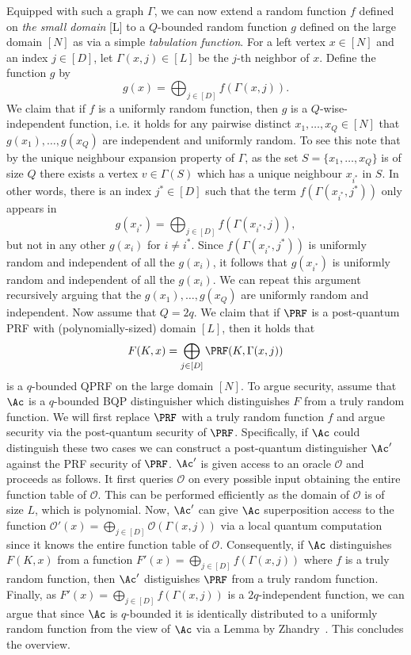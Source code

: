 Equipped with such a graph $\Gamma$, we can now extend a random function $f$ defined on \emph{the small domain} [L] to a $Q$-bounded random function $g$ defined on the large domain $[N]$ as via a simple \emph{tabulation function}. For a left vertex $x \in [N]$ and an index $j \in [D]$, let $\Gamma(x,j) \in [L]$ be the $j$-th neighbor of $x$. Define the function $g$ by
\[
g(x) = \bigoplus_{j \in [D]} f(\Gamma(x,j)).
\]
We claim that if $f$ is a uniformly random function, then $g$ is a $Q$-wise-independent function, i.e. it holds for any pairwise distinct $x_1,\dots,x_Q \in [N]$ that $g(x_1),\dots,g(x_Q)$ are independent and uniformly random. To see this note that by the unique neighbour expansion property of $\Gamma$, as the set $S = \{x_1,\dots,x_Q\}$ is of size $Q$ there exists a vertex $v \in \Gamma(S)$ which has a unique neighbour $x_{i^*}$ in $S$. In other words, there is an index $j^* \in [D]$ such that the term $f(\Gamma(x_{i^*},j^*))$ only appears in
\[
g(x_{i^*}) = \bigoplus_{j \in [D]} f(\Gamma(x_{i^*},j)),
\]
but not in any other $g(x_i)$ for $i \neq i^*$. Since $f(\Gamma(x_{i^*},j^*))$ is uniformly random and independent of all the $g(x_i)$, it follows that $g(x_{i^*})$ is uniformly random and independent of all the $g(x_i)$. We can repeat this argument recursively arguing that the $g(x_1),\dots,g(x_Q)$ are uniformly random and independent.
Now assume that $Q = 2q$. We claim that if $\PRF$ is a post-quantum PRF with (polynomially-sized) domain $[L]$, then it holds that
\[
F(K,x) = \bigoplus_{j \in [D]} \PRF(K,\Gamma(x,j))
\]
is a $q$-bounded QPRF on the large domain $[N]$. To argue security, assume that $\Ac$ is a $q$-bounded BQP distinguisher which distinguishes $F$ from a truly random function. We will first replace $\PRF$ with a truly random function $f$ and argue security via the post-quantum security of $\PRF$. Specifically, if $\Ac$ could distinguish these two cases we can construct a post-quantum distinguisher $\Ac'$ against the PRF security of $\PRF$. $\Ac'$ is given access to an oracle $\mathcal{O}$ and proceeds as follows. It first queries $\mathcal{O}$ on every possible input obtaining the entire function table of $\mathcal{O}$. This can be performed efficiently as the domain of $\mathcal{O}$ is of size $L$, which is polynomial. Now, $\Ac'$ can give $\Ac$ superposition access to the function $\mathcal{O}'(x) = \bigoplus_{j \in [D]} \mathcal{O}(\Gamma(x,j))$ via a local quantum computation since it knows the entire function table of $\mathcal{O}$. Consequently, if $\Ac$ distinguishes $F(K,x)$ from a function $F'(x) = \bigoplus_{j \in [D]} f(\Gamma(x,j))$ where $f$ is a truly random function, then $\Ac'$ distiguishes $\PRF$ from a truly random function.
%
Finally, as $F'(x) = \bigoplus_{j \in [D]} f(\Gamma(x,j))$ is a $2q$-independent function, we can argue that since $\Ac$ is $q$-bounded it is identically distributed to a uniformly random function from the view of $\Ac$ via a Lemma by Zhandry~\cite{FOCS:Zhandry12}. This concludes the overview. 

